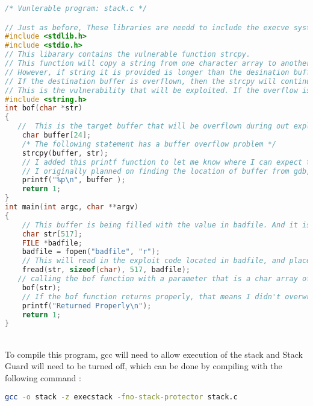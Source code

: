 \documentclass[14pt]{extarticle}
\begin{document}
\begin{lstlisting}[language=c]
/* Vunlerable program: stack.c */

// Just as before, These libraries are needd to include the execve system function
#include <stdlib.h>
#include <stdio.h>
// This libarary contains the vulnerable function strcpy.
// This function will copy a string from one character array to another, and it will only stop when it sees a null value.
// However, if string it is provided is longer than the desination buffer with no null values to end it, then the strcpy function will continue copying values from the source buffer into the destination, even if it overflows the destination buffer.
// If the destination buffer is overflown, then the strcpy will continue writing the source values directly onto the stack.
// This is the vulnerability that will be exploited. If the overflow is long enough, it will be possible to change the return address of the function. And if we place our own assembly code in the stack, I can set the return address to return to the exploit code.
#include <string.h>
int bof(char *str)
{
   //  This is the target buffer that will be overflown during out exploit
    char buffer[24];
    /* The following statement has a buffer overflow problem */
    strcpy(buffer, str);
    // I added this printf function to let me know where I can expect to find the start of the stack.
    // I originally planned on finding the location of buffer from gdb, but gdb adds in it's own acm
    printf("%p\n", buffer );
    return 1;
}
int main(int argc, char **argv)
{
    // This buffer is being filled with the value in badfile. And it is much larger than the buffer in bof.
    char str[517];
    FILE *badfile;
    badfile = fopen("badfile", "r");
    // This will read in the exploit code located in badfile, and place it  in the str variable. later this code will be placed on the stack in the bof function.
    fread(str, sizeof(char), 517, badfile);
   // calling the bof function with a parameter that is a char array of 517 bytes ( much larger than the 24 byte buffer in bof)
    bof(str);
    // If the bof function returns properly, that means I didn't overwrite the return address correctly. This will let me know that it returned to the main function.
    printf("Returned Properly\n");
    return 1;
}
\end{lstlisting}\cite{seed-bof}\\

To compile this program, gcc will need to allow execution of the stack and Stack Guard will need to be turned off, which can be done by compiling with the following command \cite{seed-bof}:
\begin{lstlisting}[language=sh]
    gcc -o stack -z execstack -fno-stack-protector stack.c
\end{lstlisting}
\end{document}
